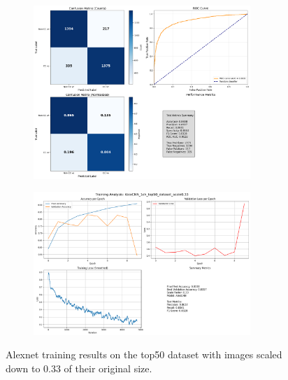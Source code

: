 \documentclass{pracalicmgr}
\begin{document}
\newpage

\begin{figure}[H]
    \centering
    \begin{subfigure}{\textwidth}
        \centering
        \includegraphics[width=0.9\textwidth]{src/AlexCNN_1ch_top50_dataset_scale033.png}
        \label{fig:top5033sub1}
    \end{subfigure}
    
    \vspace{1cm}
    
    \begin{subfigure}{\textwidth}
        \centering
        \includegraphics[width=0.9\textwidth]{src/AlexCNN_1ch_top50_dataset_scale033loss.png}
        \label{fig:top5033sub2}
    \end{subfigure}
    \caption{Alexnet training results on the top50 dataset with images scaled down to 0.33 of their original size.}
    \label{fig:top5033stacked}
\end{figure}
\end{document}
